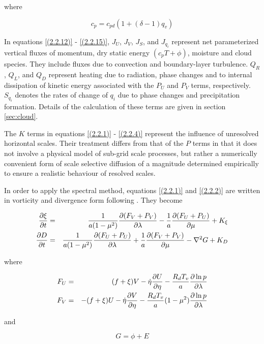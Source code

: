 where

\[
c_p = c_{pd}(1+(\delta-1)q_v)
\]	

In equations \ref{(2.2.12)} - \ref{(2.2.15)}, $J_U$, $J_V$, $J_S$, and
$J_{q_i}$ represent net parameterized vertical fluxes of momentum, dry
static energy $(c_pT+\phi)$, moisture and cloud species. They include
fluxes due to convection and boundary-layer turbulence. $Q_R$, $Q_L$,
and $Q_D$ represent heating due to radiation, phase changes
and to internal
dissipation of kinetic energy associated with the $P_U$ and $P_V$
terms, respectively. $S_{q_i}$ denotes the rates of change of $q_i$
due to phase changes and precipitation formation. Details
of the calculation of these terms are given in section
\ref{sec:cloud}.

The $K$ terms in equations \ref{(2.2.1)} - \ref{(2.2.4)} represent the
influence of unresolved horizontal scales. Their treatment differs
from that of the $P$ terms in that it does not involve a physical model of
sub-grid scale processes, but rather a numerically convenient form of
scale selective diffusion of a magnitude determined empirically to
ensure a realistic behaviour of resolved scales.

In order to apply the spectral method, equations \ref{(2.2.1)} and
\ref{(2.2.2)} are written in vorticity and divergence form following
\cite{bourke72}. They become

\begin{eqnarray}
\frac {\partial \xi} {\partial t} & = & \frac{1}{a(1-\mu^2)}\frac {\partial (F_V+P_V)} {\partial \lambda}
-\frac{1}{a}\frac {\partial (F_U+P_U)} {\partial \mu}+K_{\xi}
\label{(2.2.17)}\\
\frac {\partial D} {\partial t}   & = & \frac{1}{a(1-\mu^2)}\frac {\partial (F_U+P_U)} {\partial \lambda}
+\frac{1}{a}\frac {\partial (F_V+P_V)} {\partial \mu}-\nabla^2G+K_D
\label{(2.2.18)} 
\end{eqnarray}

where

\begin{eqnarray}
F_U & = & (f+\xi)V-\dot{\eta}\frac {\partial U} {\partial \eta}
         -\frac{R_dT_v}{a}\frac {\partial \ln{p}} {\partial \lambda}
\label{(2.2.19)}\\
F_V & = & -(f+\xi)U-\dot{\eta}\frac {\partial V} {\partial \eta}
         -\frac{R_dT_v}{a}(1-\mu^2)\frac {\partial \ln{p}} {\partial \lambda}
\label{(2.2.20)} 
\end{eqnarray}

and

\begin{equation}
G = \phi+E
\label{(2.2.21)} 
\end{equation}

